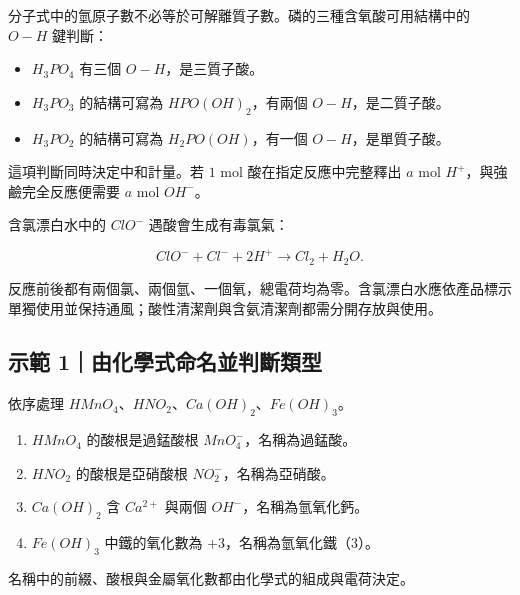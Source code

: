 \documentclass[11pt,a4paper]{article}
\providecommand{\tightlist}{%
  \setlength{\itemsep}{0pt}\setlength{\parskip}{0pt}}
\begin{document}
分子式中的氫原子數不必等於可解離質子數。磷的三種含氧酸可用結構中的 \(O-H\) 鍵判斷：

\begin{itemize}
\tightlist
\item
  \(H_3PO_4\) 有三個 \(O-H\)，是三質子酸。
\item
  \(H_3PO_3\) 的結構可寫為 \(HPO(OH)_2\)，有兩個 \(O-H\)，是二質子酸。
\item
  \(H_3PO_2\) 的結構可寫為 \(H_2PO(OH)\)，有一個 \(O-H\)，是單質子酸。
\end{itemize}

這項判斷同時決定中和計量。若 \(1\) mol 酸在指定反應中完整釋出 \(a\) mol \(H^+\)，與強鹼完全反應便需要 \(a\) mol \(OH^-\)。

含氯漂白水中的 \(ClO^-\) 遇酸會生成有毒氯氣：

\[
ClO^-+Cl^-+2H^+\rightarrow Cl_2+H_2O.
\]

反應前後都有兩個氯、兩個氫、一個氧，總電荷均為零。含氯漂白水應依產品標示單獨使用並保持通風；酸性清潔劑與含氨清潔劑都需分開存放與使用。

\begin{HandoutWorkedExample}

\subsection{示範 1｜由化學式命名並判斷類型}\label{ux793aux7bc4-1ux7531ux5316ux5b78ux5f0fux547dux540dux4e26ux5224ux65b7ux985eux578b}

依序處理 \(HMnO_4\)、\(HNO_2\)、\(Ca(OH)_2\)、\(Fe(OH)_3\)。

\begin{enumerate}
\def\labelenumi{\arabic{enumi}.}
\tightlist
\item
  \(HMnO_4\) 的酸根是過錳酸根 \(MnO_4^-\)，名稱為過錳酸。
\item
  \(HNO_2\) 的酸根是亞硝酸根 \(NO_2^-\)，名稱為亞硝酸。
\item
  \(Ca(OH)_2\) 含 \(Ca^{2+}\) 與兩個 \(OH^-\)，名稱為氫氧化鈣。
\item
  \(Fe(OH)_3\) 中鐵的氧化數為 \(+3\)，名稱為氫氧化鐵（3）。
\end{enumerate}

名稱中的前綴、酸根與金屬氧化數都由化學式的組成與電荷決定。

\end{HandoutWorkedExample}
\end{document}
